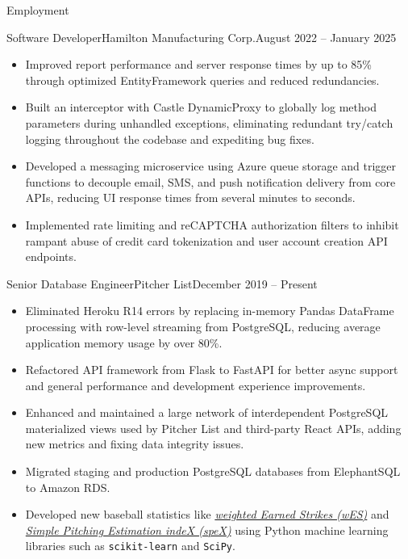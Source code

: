 \documentclass[calibri]{mcdowellcv}
\begin{document}
\begin{cvsection}{Employment}
\begin{cvsubsection}{Software Developer}{Hamilton Manufacturing Corp.}{August 2022 -- January 2025}
\begin{itemize}
				\item Improved report performance and server response times by up to 85\% through optimized EntityFramework queries and reduced redundancies.
				\item Built an interceptor with Castle DynamicProxy to globally log method parameters during unhandled exceptions, eliminating redundant try/catch logging throughout the codebase and expediting bug fixes.
				\item Developed a messaging microservice using Azure queue storage and trigger functions to decouple email, SMS, and push notification delivery from core APIs, reducing UI response times from several minutes to seconds.
				\item Implemented rate limiting and reCAPTCHA authorization filters to inhibit rampant abuse of credit card tokenization and user account creation API endpoints.
			\end{itemize}
		\end{cvsubsection}
		\begin{cvsubsection}{Senior Database Engineer}{Pitcher List}{December 2019 -- Present}
			\begin{itemize}
				\item Eliminated Heroku R14 errors by replacing in-memory Pandas DataFrame processing with row-level streaming from PostgreSQL, reducing average application memory usage by over 80\%.
				\item Refactored API framework from Flask to FastAPI for better async support and general performance and development experience improvements.
				\item Enhanced and maintained a large network of interdependent PostgreSQL materialized views used by Pitcher List and third-party React APIs, adding new metrics and fixing data integrity issues.
				\item Migrated staging and production PostgreSQL databases from ElephantSQL to Amazon RDS.			
				\item Developed new baseball statistics like \textit{\color{blue}\href{https://pitcherlist.com/wes-rate-creating-an-improved-csw-rate/}{weighted Earned Strikes (wES)}} and \textit{\color{blue}\href{https://pitcherlist.com/putting-it-all-together-using-spex-as-the-ultimate-pitching-estimator/}{Simple Pitching Estimation indeX (speX)}} using Python machine learning libraries such as \texttt{scikit-learn} and \texttt{SciPy}.
			\end{itemize}
		\end{cvsubsection}
	\end{cvsection}
\end{document}
